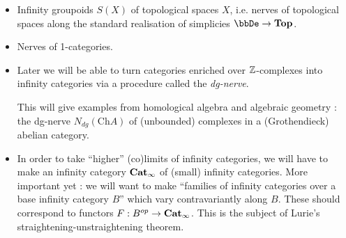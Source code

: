 \documentclass[./main.tex]{subfiles}
\begin{document}
\begin{eg}
  \begin{itemize}
    \item Infinity groupoids $S(X)$ of topological spaces $X$, 
    i.e. nerves of topological spaces along 
    the standard realisation of simplicies $\bbDe \to \TOP$.
    \item Nerves of 1-categories.
    \item Later we will be able to turn categories
    enriched over $\mathbb{Z}$-complexes into infinity categories
    via a procedure called the \emph{dg-nerve}.
    
    This will give examples from homological algebra and algebraic geometry : 
    the dg-nerve $N_{dg} (\mathrm{Ch} A)$ of (unbounded) complexes
    in a (Grothendieck) abelian category.
    \item In order to take ``higher'' (co)limits of infinity categories,
    we will have to make an infinity category $\mathbf{Cat}_{\infty}$ 
    of (small) infinity categories.
    More important yet : 
    we will want to make ``families of infinity categories over 
    a base infinity category $B$'' which vary contravariantly along $B$.
    These should correspond to functors $F : B^{op} \to \mathbf{Cat}_\infty$.
    This is the subject of Lurie's straightening-unstraightening theorem.

  \end{itemize}
\end{eg}
\end{document}
